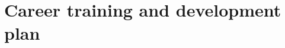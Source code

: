 \documentclass[journal,onecolumn]{IEEEtran}
\begin{document}
\section{Career training and development plan} %





%
%

\end{document}
